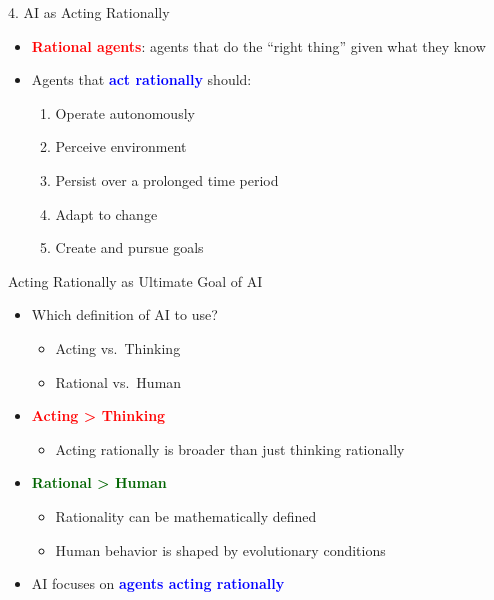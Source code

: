 \documentclass[
  10pt,
  ignorenonframetext,
]{beamer}
\providecommand{\tightlist}{%
  \setlength{\itemsep}{0pt}\setlength{\parskip}{0pt}}
\begin{document}
\begin{frame}{4. AI as Acting Rationally}
\label{ai-as-acting-rationally}
\begin{itemize}
\item
  \textbf{\textcolor{red}{Rational agents}}: agents that do the ``right
  thing'' given what they know
\item
  Agents that \textbf{\textcolor{blue}{act rationally}} should:

  \begin{enumerate}
  \tightlist
  \item
    Operate autonomously
  \item
    Perceive environment
  \item
    Persist over a prolonged time period
  \item
    Adapt to change
  \item
    Create and pursue goals
  \end{enumerate}
\end{itemize}
\end{frame}

\begin{frame}{Acting Rationally as Ultimate Goal of AI}
\label{acting-rationally-as-ultimate-goal-of-ai}
\begin{itemize}
\tightlist
\item
  Which definition of AI to use?

  \begin{itemize}
  \tightlist
  \item
    Acting vs.~Thinking
  \item
    Rational vs.~Human
  \end{itemize}
\item
  \textbf{\textcolor{red}{Acting > Thinking}}

  \begin{itemize}
  \tightlist
  \item
    Acting rationally is broader than just thinking rationally
  \end{itemize}
\item
  \textbf{\textcolor{darkgreen}{Rational > Human}}

  \begin{itemize}
  \tightlist
  \item
    Rationality can be mathematically defined
  \item
    Human behavior is shaped by evolutionary conditions
  \end{itemize}
\item
  AI focuses on \textbf{\textcolor{blue}{agents acting rationally}}
\end{itemize}
\end{frame}
\end{document}
